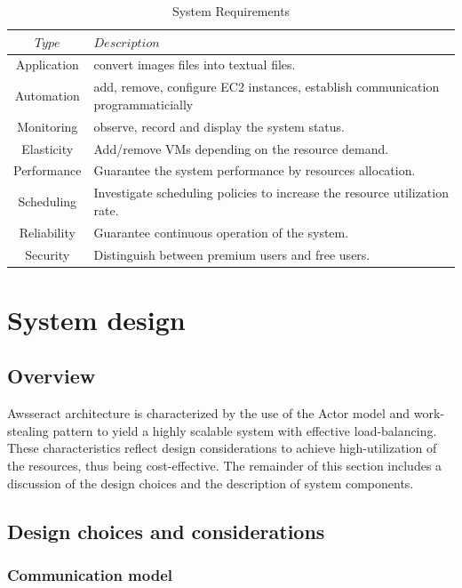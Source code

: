 \documentclass[conference]{IEEEtran}
\begin{document}
\begin{table}[H]
\renewcommand{\arraystretch}{1.3}
\caption{System Requirements}\label{tab:sysreq}
\centering
\begin{tabular*}{8cm}{c|p{5cm}}
    \hline
    $Type$&$Description$\\
    \hline
    Application&convert images files into textual files.\\
    Automation&add, remove, configure EC2 instances, establish communication programmaticially\\
    Monitoring&observe, record and display the system status.\\
    Elasticity&Add/remove VMs depending on the resource demand.\\
    Performance&Guarantee the system performance by resources allocation.\\
    Scheduling&Investigate scheduling policies to increase the resource utilization rate.\\
    Reliability&Guarantee continuous operation of the system.\\
    Security&Distinguish between premium users and free users.\\
    \hline
\end{tabular*}
\end{table}

\section{System design}\label{sec:sysdesign}

\subsection{Overview}
\noindent
Awsseract architecture is characterized by the use of the Actor model and work-stealing pattern to yield a highly scalable system with effective load-balancing. These characteristics reflect design considerations to achieve high-utilization of the resources, thus being cost-effective. The remainder of this section includes a discussion of the design choices and the description of system components.   



\subsection{Design choices and considerations}\label{sec:sysdesign_choices}

\subsubsection{Communication model}\label{sec:sysdesign_com}
\end{document}
